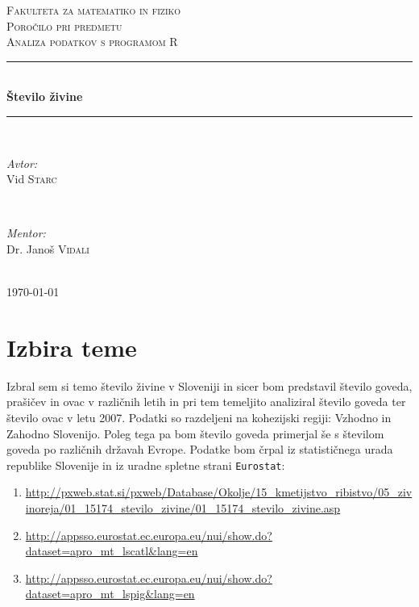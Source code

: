 \documentclass[11pt,a4paper]{article}
\begin{document}
\begin{titlepage}
\newcommand{\HRule}{\rule{\linewidth}{0.5mm}}
\center

\textsc{\LARGE Fakulteta za matematiko in fiziko}\\[3 cm]
\textsc{\Large Poročilo pri predmetu}\\[0.5cm]
\textsc{\large Analiza podatkov s programom R}\\[2 cm]
\HRule \\[0.4cm]
{ \huge \bfseries Število živine}\\[0.4cm] 
\HRule \\[6 cm]


\begin{minipage}{0.4\textwidth}
\begin{flushleft} \large
\emph{Avtor:}\\
Vid \textsc{Starc}
\end{flushleft}
\end{minipage}
~
\begin{minipage}{0.4\textwidth}
\begin{flushright} \large
\emph{Mentor:} \\
Dr. Janoš \textsc{Vidali}
\end{flushright}
\end{minipage}\\[2 cm]

{\large \today}\\[3cm] 


\end{titlepage}


\section{Izbira teme}
Izbral sem si temo število živine v Sloveniji in sicer bom predstavil število goveda, prašičev in ovac v različnih letih in pri tem temeljito analiziral število goveda ter število ovac v letu 2007. Podatki so razdeljeni na kohezijski regiji: Vzhodno in Zahodno Slovenijo. Poleg tega pa bom število goveda primerjal še s številom goveda po različnih državah Evrope. Podatke bom črpal iz statističnega urada republike Slovenije in iz uradne spletne strani \verb|Eurostat|:
\begin{enumerate}
\item \url{http://pxweb.stat.si/pxweb/Database/Okolje/15_kmetijstvo_ribistvo/05_zivinoreja/01_15174_stevilo_zivine/01_15174_stevilo_zivine.asp}

\item \url{http://appsso.eurostat.ec.europa.eu/nui/show.do?dataset=apro_mt_lscatl&lang=en}

\item \url{http://appsso.eurostat.ec.europa.eu/nui/show.do?dataset=apro_mt_lspig&lang=en}
\end{enumerate}
\end{document}
